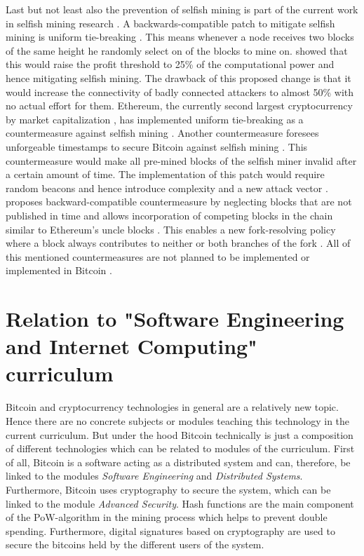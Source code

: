 \documentclass{scrartcl}
\begin{document}
Last but not least also the prevention of selfish mining is part of the current work in selfish mining research \cite{eyal2014majority, billah2015one, solat2016zeroblock, zhang2017publish}.
A backwards-compatible patch to mitigate selfish mining is uniform tie-breaking \cite{eyal2014majority}.
This means whenever a node receives two blocks of the same height he randomly select on of the blocks to mine on.
\cite{eyal2014majority} showed that this would raise the profit threshold to 25\% of the computational power and hence mitigating selfish mining.
The drawback of this proposed change is that it would increase the connectivity of badly connected attackers to almost 50\% with no actual effort for them.
Ethereum, the currently second largest cryptocurrency by market capitalization \cite{marketcap2017}, has implemented uniform tie-breaking as a countermeasure against selfish mining \cite{gervais2016security, unifromtiebreakingethereum}.
Another countermeasure foresees unforgeable timestamps to secure Bitcoin against selfish mining \cite{billah2015one}.
This countermeasure would make all pre-mined blocks of the selfish miner invalid after a certain amount of time.
The implementation of this patch would require random beacons and hence introduce complexity and a new attack vector \cite{billah2015one}.
\cite{zhang2017publish} proposes backward-compatible countermeasure by neglecting blocks that are not published in time and allows incorporation of competing blocks in the chain similar to Ethereum's uncle blocks \cite{wood2014ethereum}.
This enables a new fork-resolving policy where a block always contributes to neither or both branches of the fork \cite{zhang2017publish}.
All of this mentioned countermeasures are not planned to be implemented or implemented in Bitcoin \cite{bitcoin, bitcoinbip}.

\section{Relation to "Software Engineering and Internet Computing" curriculum}
Bitcoin and cryptocurrency technologies in general are a relatively new topic.
Hence there are no concrete subjects or modules teaching this technology in the current curriculum.
But under the hood Bitcoin technically is just a composition of different technologies which can be related to modules of the curriculum.
First of all, Bitcoin is a software acting as a distributed system and can, therefore, be linked to the modules \textit{Software Engineering} and \textit{Distributed Systems}.
Furthermore, Bitcoin uses cryptography to secure the system, which can be linked to the module \textit{Advanced Security}.
Hash functions are the main component of the PoW-algorithm in the mining process which helps to prevent double spending.
Furthermore, digital signatures based on cryptography are used to secure the bitcoins held by the different users of the system.
\end{document}
